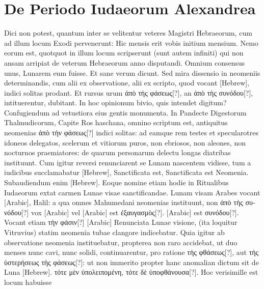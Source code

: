 \section{De Periodo Iudaeorum Alexandrea}
%
Dici non potest, quantum inter se velitentur veteres Magistri
Hebraeorum, cum ad illum locum Exodi  pervenerunt:
Hic mensis erit vobis initium mensium.
Nemo eorum est,
quotquot in illum locum scripserunt (sunt autem infiniti) qui non ansam
arripiat de veterum Hebraeorum anno disputandi.
Omnium
consensus unus, Lunarem eum fuisse.
Et sane verum dicunt.
Sed mira
dissensio in neomeniis determinandis, cum alii ex observatione, alii ex
scripto, quod vocant \texthebrew{}[Hebrew], indici solitas prodant.
Et rursus urum
\textgreek{ἀπὸ τὴς φάσεως[?]}, an \textgreek{ἀπὸ τὴς συνόδου[?]},
 intituerentur, dubitant.
In hoc opinionum bivio, quis intendet digitum?
Confugiendum ad vetustiora
eius gentis monumenta.
In Pandecte Digestorum Thalmudicorum,
Capite Ros haschana, omnino scriptum est, antiquitus
neomenias \textgreek{ἀπὸ τὴν φάσεως[?]} indici solitas: ad eamque rem testes et
specularotres idoneos delegatos, scelerum et vitiorum puros, non
ebriosos, non aleones, non nocturnos praemiatores: de quarum personarum
delectu longas diatribas instituunt.
Cum igitur reversi renunciarent
se Lunam nascentem vidisse, tum a iudicibus succlamabatur
\texthebrew{}[Hebrew], Sanctificata est, Sanctificata est Neomenia.
Subaudiendum
enim \texthebrew{}[Hebrew].
Eoque nomine etiam hodie in Ritualibus Iudaeorum
extat carmen Lunae visae sanctificandae.
Lunam visam Arabes
vocant \textarabic{}[Arabic], Halil: a qua omnes Mahumedani
 neomenias instituunt,
non \textgreek{ἀπὸ τὴς συνόδου[?]} vox \textarabic{}[Arabic] vel
 \textarabic{}[Arabic] est \textgreek{ἐξαυγασμὸς[?]}.
%
\textarabic{}[Arabic]
est \textgreek{συνόδου[?]}.
Vocant etiam \textgreek{τὴν φάσιν[?]} \textarabic{}[Arabic]
Renunciata Lunae visione,
(ita loquitur Vitruvius) statim neomenia tubae clangore indicebatur.
Quia igitur ab observatione neomenia instituebatur, propterea non raro
accidebat, ut duo menses nunc cavi, nunc solidi, continuarentur, pro
ratione \textgreek{τὴς φθάσεως[?]},
 aut \textgreek{τὴς ὑστερήσεως τὴς φάσεως[?]}: ut non immerito propter
hanc anomalian dictum sit de Luna \texthebrew{}[Hebrew].
\textgreek{τότε
μὲν ὑπολειπομένη, τότε δὲ ὑποφθάνουσα[?]}.
Hoc verisimille est locum habuisse
